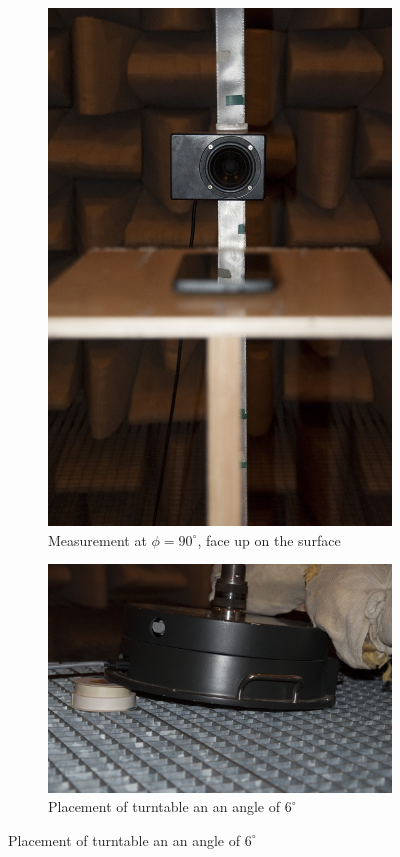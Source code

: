 \begin{figure}[h!]
\begin{subfigure}[b]{0.5\textwidth}
                \centering
    			\includegraphics[height=0.28\textheight]{afbeeldingen/plywood.jpg}
    			\caption{Measurement at $\phi=90^\circ$, face up on the surface}
			    \label{fig:phi=90FU}
        \end{subfigure}
        
        \begin{subfigure}[b]{0.5\textwidth}
			    \centering
    			\includegraphics[width=\textwidth]{afbeeldingen/turntable_schuin.jpg}
    			\caption{Placement of turntable an an angle of $6^\circ$}
			    \label{fig:turnt_schuin}
                

\end{subfigure}
\end{figure}

